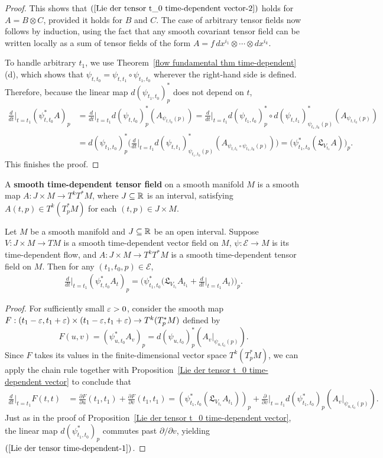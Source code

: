 \begin{proof}
This shows that $(\ref{Lie der tensor t_0 time-dependent vector-2})$ holds for $A=B\otimes C$, provided it holds for $B$ and $C$. The case of arbitrary tensor fields now follows by induction, using the fact that any smooth covariant tensor field can be written locally as a sum of tensor fields of the form $A=f\,dx^{i_1}\otimes\cdots\otimes dx^{i_k}$.\par
To handle arbitrary $t_1$, we use Theorem~\ref{flow fundamental thm time-dependent}(d), which shows that $\psi_{t,t_0}=\psi_{t,t_1}\circ\psi_{t_1,t_0}$ wherever the right-hand side is defined. Therefore, because the linear map $d(\psi_{t_1,t_0})_p^*$ does not depend on $t$,
\begin{align*}
\frac{d}{dt}\Big|_{t=t_1}(\psi_{t,t_0}^*A)_p&=\frac{d}{dt}\Big|_{t=t_1}d(\psi_{t,t_0})_p^*(A_{\psi_{t,t_0}(p)})=\frac{d}{dt}\Big|_{t=t_1}d(\psi_{t_1,t_0})_p^*\circ d(\psi_{t,t_1})_{\psi_{t_1,t_0}(p)}^*(A_{\psi_{t,t_0}(p)})\\
&=d(\psi_{t_1,t_0})_p^*\Big(\frac{d}{dt}\Big|_{t=t_1}d(\psi_{t,t_1})_{\psi_{t_1,t_0}(p)}^*(A_{\psi_{t,t_1}\circ\psi_{t_1,t_0}(p)})\Big)=\big(\psi_{t_1,t_0}^*(\mathfrak{L}_{V_{t_1}}A)\big)_p.
\end{align*}
This finishes the proof.
\end{proof}
A \textbf{smooth time-dependent tensor field} on a smooth manifold $M$ is a smooth map $A:J\times M\to T^kT^*M$, where $J\subseteq\mathbb{R}$ is an interval, satisfying $A(t,p)\in T^k(T_p^*M)$ for each $(t,p)\in J\times M$.
\begin{proposition}\label{Lie der tensor time-dependent}
Let $M$ be a smooth manifold and $J\subseteq\mathbb{R}$ be an open interval. Suppose $V:J\times M\to TM$ is a smooth time-dependent vector field on $M$, $\psi:\mathcal{E}\to M$ is its time-dependent flow, and $A:J\times M\to T^kT^*M$ is a smooth time-dependent tensor field on $M$. Then for any $(t_1,t_0,p)\in\mathcal{E}$,
\begin{align}\label{Lie der tensor time-dependent-1}
\frac{d}{dt}\Big|_{t=t_1}(\psi^*_{t,t_0}A_t)_p=\Big(\psi_{t_1,t_0}^*\Big(\mathfrak{L}_{V_{t_1}}A_{t_1}+\frac{d}{dt}\Big|_{t=t_1}A_t\Big)\Big)_p.
\end{align}
\end{proposition}
\begin{proof}
For sufficiently small $\varepsilon>0$, consider the smooth map $F:(t_1-\varepsilon,t_1+\varepsilon)\times(t_1-\varepsilon,t_1+\varepsilon)\to T^k(T_p^*M)$ defined by
\[F(u,v)=(\psi^*_{u,t_0}A_v)_p=d(\psi_{u,t_0})_p^*(A_v|_{\psi_{u,t_0}(p)}).\]
Since $F$ takes its values in the finite-dimensional vector space $T^k(T_p^*M)$, we can apply the chain rule together with Proposition~\ref{Lie der tensor t_0 time-dependent vector} to conclude that
\begin{align*}
\frac{d}{dt}\Big|_{t=t_1}F(t,t)&=\frac{\partial F}{\partial u}(t_1,t_1)+\frac{\partial F}{\partial v}(t_1,t_1)=(\psi_{t_1,t_0}^*(\mathfrak{L}_{V_{t_1}}A_{t_1}))_p+\frac{\partial}{\partial v}\Big|_{t=t_1}d(\psi_{t_1,t_0}^*)_p(A_v|_{\psi_{u,t_0}(p)}).
\end{align*}
Just as in the proof of Proposition~\ref{Lie der tensor t_0 time-dependent vector}, the linear map $d(\psi_{t_1,t_0}^*)_p$ commutes past $\partial/\partial v$, yielding $(\ref{Lie der tensor time-dependent-1})$.
\end{proof}
